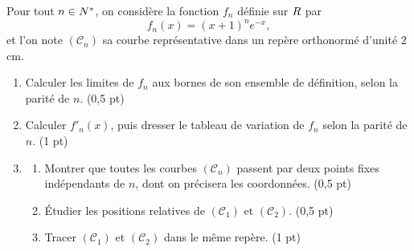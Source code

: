 \begin{commeaubac}
Pour tout $n \in N^{*}$, on considère la fonction $f_{n}$ définie sur $R$
par
\[
  f_{n}(x) = (x+1)^{n}e^{-x},
\]
et l'on note $(\mathscr{C}_{n})$ sa courbe représentative dans un repère
orthonormé d'unité $2$ cm.

\begin{enumerate}[label=\textbf{\arabic*.}, leftmargin=*, itemsep=0.25em]
  \item Calculer les limites de $f_{n}$ aux bornes de son ensemble de
        définition, selon la parité de $n$. \hfill\textup{(0,5 pt)}
  \item Calculer $f'_{n}(x)$, puis dresser le tableau de variation de $f_{n}$
        selon la parité de $n$. \hfill\textup{(1 pt)}
  \item \begin{enumerate}[label=\textbf{\alph*)}, leftmargin=1.4em]
          \item Montrer que toutes les courbes $(\mathscr{C}_{n})$ passent par
                deux points fixes indépendants de $n$, dont on précisera les
                coordonnées. \hfill\textup{(0,5 pt)}
          \item Étudier les positions relatives de $(\mathscr{C}_{1})$ et
                $(\mathscr{C}_{2})$. \hfill\textup{(0,5 pt)}
          \item Tracer $(\mathscr{C}_{1})$ et $(\mathscr{C}_{2})$ dans le même
                repère. \hfill\textup{(1 pt)}
        \end{enumerate}
\end{enumerate}
\end{commeaubac}

